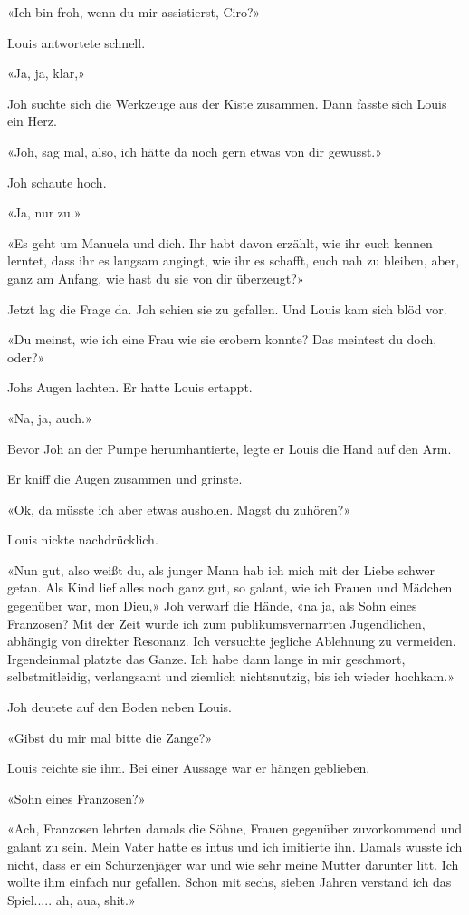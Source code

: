 «Ich bin froh, wenn du mir assistierst, Ciro?»

Louis antwortete schnell.

«Ja, ja, klar,»

Joh suchte sich die Werkzeuge aus der Kiste zusammen. Dann fasste sich
Louis ein Herz.

«Joh, sag mal, also, ich hätte da noch gern etwas von dir gewusst.»

Joh schaute hoch.

«Ja, nur zu.»

«Es geht um Manuela und dich. Ihr habt davon erzählt, wie ihr euch
kennen lerntet, dass ihr es langsam angingt, wie ihr es schafft, euch
nah zu bleiben, aber, ganz am Anfang, wie hast du sie von dir
überzeugt?»

Jetzt lag die Frage da. Joh schien sie zu gefallen. Und Louis kam sich
blöd vor.

«Du meinst, wie ich eine Frau wie sie erobern konnte? Das meintest du
doch, oder?»

Johs Augen lachten. Er hatte Louis ertappt.

«Na, ja, auch.»

Bevor Joh an der Pumpe herumhantierte, legte er Louis die Hand auf den
Arm.

Er kniff die Augen zusammen und grinste.

«Ok, da müsste ich aber etwas ausholen. Magst du zuhören?»

Louis nickte nachdrücklich.

«Nun gut, also weißt du, als junger Mann hab ich mich mit der Liebe
schwer getan. Als Kind lief alles noch ganz gut, so galant, wie ich
Frauen und Mädchen gegenüber war, mon Dieu,» Joh verwarf die Hände, «na
ja, als Sohn eines Franzosen? Mit der Zeit wurde ich zum
publikumsvernarrten Jugendlichen, abhängig von direkter Resonanz. Ich
versuchte jegliche Ablehnung zu vermeiden. Irgendeinmal platzte das
Ganze. Ich habe dann lange in mir geschmort, selbstmitleidig,
verlangsamt und ziemlich nichtsnutzig, bis ich wieder hochkam.»

Joh deutete auf den Boden neben Louis.

«Gibst du mir mal bitte die Zange?»

Louis reichte sie ihm. Bei einer Aussage war er hängen geblieben.

«Sohn eines Franzosen?»

«Ach, Franzosen lehrten damals die Söhne, Frauen gegenüber zuvorkommend
und galant zu sein. Mein Vater hatte es intus und ich imitierte ihn.
Damals wusste ich nicht, dass er ein Schürzenjäger war und wie sehr
meine Mutter darunter litt. Ich wollte ihm einfach nur gefallen. Schon
mit sechs, sieben Jahren verstand ich das Spiel..... ah, aua, shit.»

